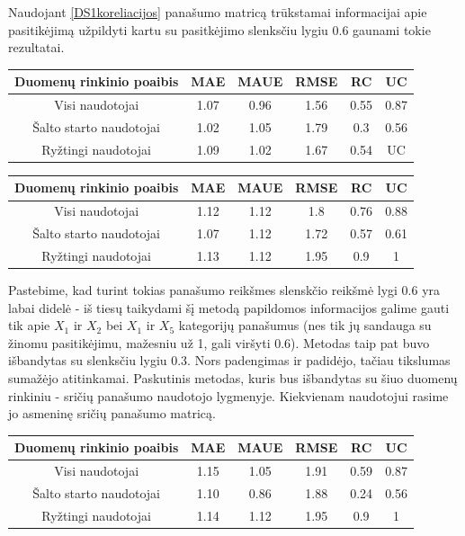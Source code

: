 \documentclass{VUMIFInfMagistrinis}
\begin{document}
\indent 
Naudojant \ref{DS1koreliacijos} panašumo matricą trūkstamai informacijai apie pasitikėjimą užpildyti kartu su pasitkėjimo slenksčiu lygiu 0.6 gaunami tokie rezultatai.
\begin{center}
	\begin{tabular}{||c c c c c c||} 
		Duomenų rinkinio poaibis & MAE & MAUE & RMSE & RC & UC \\
		\hline
		Visi naudotojai & 1.07 & 0.96 & 1.56 & 0.55 & 0.87 \\
		\hline
		Šalto starto naudotojai & 1.02 & 1.05 & 1.79 & 0.3 & 0.56 \\
		\hline
		Ryžtingi naudotojai & 1.09 & 1.02 & 1.67 & 0.54 & UC \\
	\end{tabular}
\end{center}
\begin{center}
	\begin{tabular}{||c c c c c c||} 
		Duomenų rinkinio poaibis & MAE & MAUE & RMSE & RC & UC \\
		\hline
		Visi naudotojai & 1.12 & 1.12 & 1.8 & 0.76 & 0.88 \\
		\hline
		Šalto starto naudotojai & 1.07 & 1.12 & 1.72 & 0.57 & 0.61 \\
		\hline
		Ryžtingi naudotojai & 1.13 & 1.12 & 1.95 & 0.9 & 1 \\
	\end{tabular}
\end{center}
Pastebime, kad turint tokias panašumo reikšmes slenskčio reikšmė lygi 0.6 yra labai didelė - iš tiesų taikydami šį metodą papildomos informacijos galime gauti tik apie $X_1$ ir $X_2$ bei $X_1$ ir $X_5$ kategorijų panašumus (nes tik jų sandauga su žinomu pasitikėjimu, mažesniu už 1, gali viršyti 0.6). Metodas taip pat buvo išbandytas su slenksčiu lygiu 0.3. Nors padengimas ir padidėjo, tačiau tikslumas sumažėjo atitinkamai. 
\newline
\indent 
Paskutinis metodas, kuris bus išbandytas su šiuo duomenų rinkiniu - sričių panašumo naudotojo lygmenyje. Kiekvienam naudotojui rasime jo asmeninę sričių panašumo matricą.
\begin{center}
	\begin{tabular}{||c c c c c c||} 
		Duomenų rinkinio poaibis & MAE & MAUE & RMSE & RC & UC \\
		\hline
		Visi naudotojai & 1.15 & 1.05 & 1.91 & 0.59 & 0.87 \\
		\hline
		Šalto starto naudotojai & 1.10 & 0.86 & 1.88 & 0.24 & 0.56 \\
		\hline
		Ryžtingi naudotojai & 1.14 & 1.12 & 1.95 & 0.9 & 1 \\
	\end{tabular}
\end{center}
\end{document}

